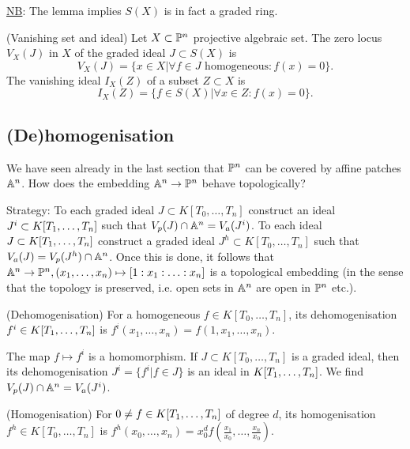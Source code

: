 \documentclass[a4paper,11pt]{article}
\begin{document}
			\noindent\underline{NB}: The lemma implies $S(X)$ is in fact a graded ring.

			\begin{defi}(Vanishing set and ideal)
				Let $X\subset\P^n$ projective algebraic set. The zero locus $V_X(J)$ in $X$ of the graded ideal $J\subset S(X)$ is
				\begin{equation*}
					V_X(J)=\{x\in X|\forall f\in J\text{ homogeneous}: f(x)=0\}.
				\end{equation*}
				The vanishing ideal $I_X(Z)$ of a subset $Z\subset X$ is
				\begin{equation*}
					I_X(Z)=\{f\in S(X)|\forall x\in Z: f(x)=0\}.
				\end{equation*}
			\end{defi}

			
		\subsection{(De)homogenisation}

			We have seen already in the last section that $\P^n$ can be covered by affine patches $\AA^n$. How does the embedding $\AA^n\rightarrow\P^n$ behave topologically?

			\noindent Strategy: To each graded ideal $J\subset K[T_0,\dots,T_n]$ construct an ideal $J^i\subset \K$ such that $V_p(J)\cap\AA^n=V_a(J^i)$. To each ideal $J\subset\K$ construct a graded ideal $J^h\subset K[T_0,\dots,T_n]$ such that $V_a(J)=V_p(J^h)\cap\AA^n$. Once this is done, it follows that $\AA^n\rightarrow\P^n,(x_1,\dots,x_n)\mapsto[1:x_1:\ldots:x_n]$ is a topological embedding (in the sense that the topology is preserved, i.e. open sets in $\AA^n$ are open in $\P^n$ etc.).

			\begin{defi}
				(Dehomogenisation) For a homogeneous $f\in K[T_0,\dots,T_n]$, its dehomogenisation $f^i\in \K$ is $f^i(x_1,\dots,x_n)=f(1,x_1,\dots,x_n)$.
			\end{defi}

			\noindent The map $f\mapsto f^i$ is a homomorphism. If $J\subset K[T_0,\dots,T_n]$ is a graded ideal, then its dehomogenisation $J^i=\{f^i|f\in J\}$ is an ideal in $\K$. We find $V_p(J)\cap\AA^n=V_a(J^i)$.

			\begin{defi}
				(Homogenisation) For $0\neq f\in\K$ of degree $d$, its homogenisation $f^h\in K[T_0,\dots,T_n]$ is $f^h(x_0,\dots,x_n)=x_0^df(\frac{x_1}{x_0},\dots,\frac{x_n}{x_0})$.
			\end{defi}
\end{document}
